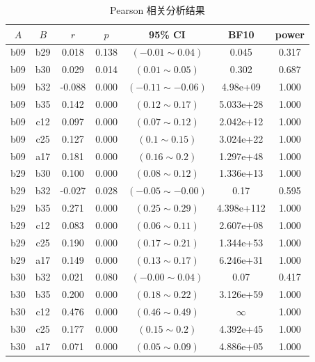 \documentclass[zihao = -4, linespread = 1.5]{article}
\begin{document}
\begin{table}[htbp]
    \centering
    \setlength{\tabcolsep}{12pt}
    \renewcommand{\arraystretch}{1.2}
    \caption{Pearson 相关分析结果}\label{table-pearson}
        \begin{tabular}{ccccccc}
            \bottomrule[1.5pt]
            $A$ & $B$ & $r$ & $p$ & 95\% CI & BF10 & power \\
            \midrule[0.75pt]
            b09 & b29 & 0.018 & 0.138 & $(-0.01\sim0.04)$ & 0.045 & 0.317 \\
            b09 & b30 & 0.029 & 0.014 & $(0.01\sim0.05)$ & 0.302 & 0.687 \\
            b09 & b32 & -0.088 & 0.000 & $(-0.11\sim-0.06)$ & 4.98e+09 & 1.000 \\
            b09 & b35 & 0.142 & 0.000 & $(0.12\sim0.17)$ & 5.033e+28 & 1.000 \\
            b09 & c12 & 0.097 & 0.000 & $(0.07\sim0.12)$ & 2.042e+12 & 1.000 \\
            b09 & c25 & 0.127 & 0.000 & $(0.1\sim0.15)$ & 3.024e+22 & 1.000 \\
            b09 & a17 & 0.181 & 0.000 & $(0.16\sim0.2)$ & 1.297e+48 & 1.000 \\
            b29 & b30 & 0.100 & 0.000 & $(0.08\sim0.12)$ & 1.336e+13 & 1.000 \\
            b29 & b32 & -0.027 & 0.028 & $(-0.05\sim-0.00)$ & 0.17 & 0.595 \\
            b29 & b35 & 0.271 & 0.000 & $(0.25\sim0.29)$ & 4.398e+112 & 1.000 \\
            b29 & c12 & 0.083 & 0.000 & $(0.06\sim0.11)$ & 2.607e+08 & 1.000 \\
            b29 & c25 & 0.190 & 0.000 & $(0.17\sim0.21)$ & 1.344e+53 & 1.000 \\
            b29 & a17 & 0.149 & 0.000 & $(0.13\sim0.17)$ & 6.246e+31 & 1.000 \\
            b30 & b32 & 0.021 & 0.080 & $(-0.00\sim0.04)$ & 0.07 & 0.417 \\
            b30 & b35 & 0.200 & 0.000 & $(0.18\sim0.22)$ & 3.126e+59 & 1.000 \\
            b30 & c12 & 0.476 & 0.000 & $(0.46\sim0.49)$ & $\infty$ & 1.000 \\
            b30 & c25 & 0.177 & 0.000 & $(0.15\sim0.2)$ & 4.392e+45 & 1.000 \\
            b30 & a17 & 0.071 & 0.000 & $(0.05\sim0.09)$ & 4.886e+05 & 1.000 \\

\end{tabular}
\end{table}
\end{document}
